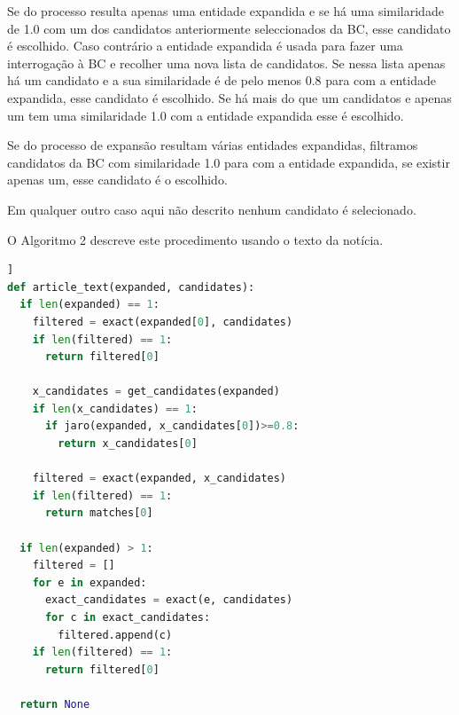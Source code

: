 \documentclass[a4paper, twocolumn, 11pt, twoside]{article}
\begin{document}
Se do processo resulta apenas uma entidade expandida e se há uma similaridade de 1.0 com um dos candidatos anteriormente seleccionados da BC, esse candidato é escolhido. Caso contrário a entidade expandida é usada para fazer uma interrogação à BC e recolher uma nova lista de candidatos. Se nessa lista apenas há um candidato e a sua similaridade é de pelo menos 0.8 para com a entidade expandida, esse candidato é escolhido. Se há mais do que um candidatos e apenas um tem uma similaridade 1.0 com a entidade expandida esse é escolhido. 

Se do processo de expansão resultam várias entidades expandidas, filtramos candidatos da BC com similaridade 1.0 para com a entidade expandida, se existir apenas um, esse candidato é o escolhido. 

Em qualquer outro caso aqui não descrito nenhum candidato é selecionado.

O Algoritmo 2 descreve este procedimento usando o texto da notícia.

\begin{lstlisting}[language=python,columns=fullflexible,frame=single,label={lst:alg2},title={Algoritmo 2. Ligação com a Wikidata usando o texto da notícia para expandir as entidades reconhecidas no título.},captionpos=b]]
def article_text(expanded, candidates):
  if len(expanded) == 1:
    filtered = exact(expanded[0], candidates)
	if len(filtered) == 1:
	  return filtered[0]
	  
    x_candidates = get_candidates(expanded)
    if len(x_candidates) == 1:
      if jaro(expanded, x_candidates[0])>=0.8:
        return x_candidates[0]
 
    filtered = exact(expanded, x_candidates)
    if len(filtered) == 1:
      return matches[0]
  
  if len(expanded) > 1:
    filtered = []
    for e in expanded:
      exact_candidates = exact(e, candidates)
	  for c in exact_candidates:
	    filtered.append(c)
    if len(filtered) == 1:
      return filtered[0]

  return None
\end{lstlisting}

\end{document}
